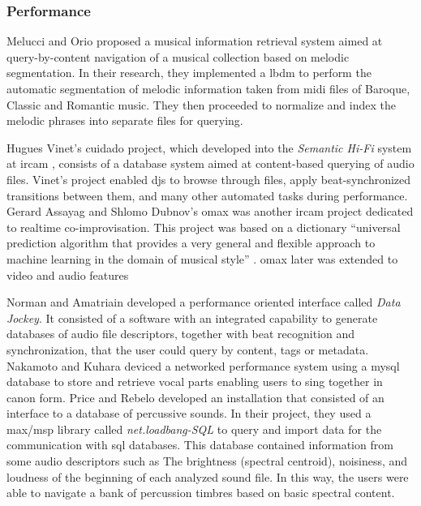 \subsubsection{Performance}
\label{application:performance}

Melucci and Orio \parencite{icmc/bbp2372.1999.355} proposed a musical information retrieval system aimed at query-by-content navigation of a musical collection based on melodic segmentation. In their research, they implemented a \gls{lbdm} to perform the automatic segmentation of melodic information taken from \gls{midi} files of Baroque, Classic and Romantic music. They then proceeded to normalize and index the melodic phrases into separate files for querying.

Hugues Vinet's \gls{cuidado} project, which developed into the \textit{Semantic Hi-Fi} system at \gls{ircam} \parencite{DBLP:conf/ismir/VinetHP02, DBLP:conf/icmc/VinetHP02, DBLP:conf/icmc/Vinet05}, consists of a database system aimed at content-based querying of audio files. Vinet's project enabled \glspl{dj} to browse through files, apply beat-synchronized transitions between them, and many other automated tasks during performance. Gerard Assayag and Shlomo Dubnov's \gls{omax} was another \gls{ircam} project dedicated to realtime co-improvisation. This project was based on a dictionary ``universal prediction algorithm that provides a very general and flexible approach to machine learning in the domain of musical style'' \parencite{DBLP:conf/icmc/AssayagDD99}. \gls{omax} later was extended to video and audio features \parencite{DBLP:conf/icmc/BlochD08}

Norman and Amatriain \parencite{icmc/bbp2372.2007.117} developed a performance oriented interface called \textit{Data Jockey}. It consisted of a software with an integrated capability to generate databases of audio file descriptors, together with beat recognition and synchronization, that the user could query by content, tags or metadata. Nakamoto and Kuhara \parencite{Nakamoto2007} deviced a networked performance system using a \gls{mysql} database to store and retrieve vocal parts enabling users to sing together in canon form. Price and Rebelo \parencite{Price2008} developed an installation that consisted of an interface to a database of percussive sounds. In their project, they used a \gls{max/msp} library called \textit{net.loadbang-SQL} to query and import data for the communication with \gls{sql} databases. This database contained information from some audio descriptors such as The brightness (spectral centroid), noisiness, and loudness of the beginning of each analyzed sound file. In this way, the users were able to navigate a bank of percussion timbres based on basic spectral content. 

